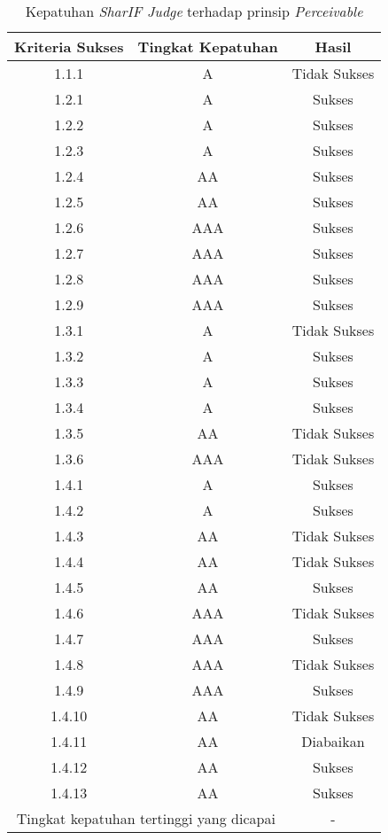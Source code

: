 \begin{table}[H]
	\centering
	\caption{Kepatuhan \textit{SharIF Judge} terhadap prinsip \textit{Perceivable}}
	\label{tab:kepatuhan_sharif_judge_perceivable}
	\begin{tabular}{|c|c|c|}
		\hline
		Kriteria Sukses & Tingkat Kepatuhan & Hasil \\
		\hline
		\rowcolor{Pink} 1.1.1 & A & Tidak Sukses\\
		1.2.1 & A & Sukses\\
		1.2.2 & A & Sukses \\
		1.2.3 & A & Sukses \\
		1.2.4 & AA & Sukses \\
		1.2.5 & AA & Sukses \\
		1.2.6 & AAA & Sukses \\
		1.2.7 & AAA & Sukses \\
		1.2.8 & AAA & Sukses \\
		1.2.9 & AAA & Sukses \\
		\rowcolor{Pink} 1.3.1 & A & Tidak Sukses\\
		1.3.2 & A & Sukses \\
		1.3.3 & A & Sukses \\
		1.3.4 & A & Sukses \\
		\rowcolor{LightRed} 1.3.5 & AA & Tidak Sukses\\
		\rowcolor{Red} 1.3.6 & AAA & Tidak Sukses\\
		1.4.1 & A & Sukses \\
		1.4.2 & A & Sukses \\
		\rowcolor{LightRed} 1.4.3 & AA & Tidak Sukses\\
		\rowcolor{LightRed} 1.4.4 & AA & Tidak Sukses\\
		1.4.5 & AA & Sukses\\
		\rowcolor{Red} 1.4.6 & AAA & Tidak Sukses\\
		1.4.7 & AAA & Sukses \\
		\rowcolor{Red} 1.4.8 & AAA & Tidak Sukses\\
		1.4.9 & AAA & Sukses\\
		\rowcolor{LightRed} 1.4.10 & AA & Tidak Sukses\\
		\rowcolor{Gray} 1.4.11 & AA & Diabaikan\\
		1.4.12 & AA & Sukses\\
		1.4.13 & AA & Sukses\\
		\hline
		\multicolumn{2}{|c|}{Tingkat kepatuhan tertinggi yang dicapai} & - \\
		\hline
	\end{tabular}
\end{table}


